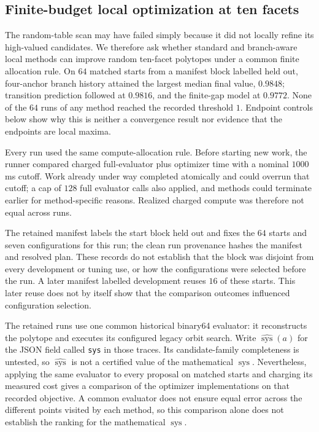 \subsection{Finite-budget local optimization at ten facets}
\label{subsec:black-box-datascience-finite-budget-optimization}

The random-table scan may have failed simply because it did not locally refine
its high-valued candidates.  We therefore ask whether standard and
branch-aware local methods can improve random ten-facet polytopes under a
common finite allocation rule.  On \(64\) matched starts from a manifest block
labelled held out, four-anchor branch history attained the largest median final
value, \(0.9848\); transition prediction followed at \(0.9816\), and the
finite-gap model at \(0.9772\).  None of the \(64\) runs of any method reached
the recorded threshold \(1\).  Endpoint controls below show why this is neither
a convergence result nor evidence that the endpoints are local maxima.

Every run used the same compute-allocation rule.  Before starting new work, the
runner compared charged full-evaluator plus optimizer time with a nominal
\(1000\)\,ms cutoff.  Work already under way completed atomically and could
overrun that cutoff; a cap of \(128\) full evaluator calls also applied, and
methods could terminate earlier for method-specific reasons.  Realized charged
compute was therefore not equal across runs.

The retained manifest labels the start block held out and fixes the \(64\)
starts and seven configurations for this run; the clean run provenance hashes
the manifest and resolved plan.  These records do not establish that the block
was disjoint from every development or tuning use, or how the configurations
were selected before the run.  A later manifest labelled development reuses
\(16\) of these starts.  This later reuse does not by itself show that the
comparison outcomes influenced configuration selection.

The retained runs use one common historical binary64 evaluator: it
reconstructs the polytope and executes its configured legacy orbit search.
Write \(\widehat{\operatorname{sys}}(a)\) for the JSON field called
\texttt{sys} in those traces.  Its candidate-family completeness is untested,
so \(\widehat{\operatorname{sys}}\) is not a certified value of the
mathematical \(\operatorname{sys}\).  Nevertheless, applying the same
evaluator to every proposal on matched starts and charging its measured cost
gives a comparison of the optimizer implementations on that recorded
objective.  A common evaluator does not ensure equal error across the
different points visited by each method, so this comparison alone does not
establish the ranking for the mathematical \(\operatorname{sys}\).

